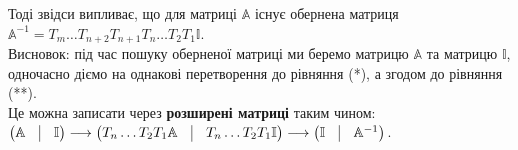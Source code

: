 \documentclass[a4paper, 10pt]{article}
\theoremstyle{theoremdd}
\begin{document}
Тоді звідси випливає, що для матриці $\mathbb{A}$ існує обернена матриця $\mathbb{A}^{-1} = T_m \dots T_{n+2} T_{n+1} T_n \dots T_2 T_1 \mathbb{I}$.
\bigskip \\
Висновок: під час пошуку оберненої матриці ми беремо матрицю $\mathbb{A}$ та матрицю $\mathbb{I}$, одночасно діємо на однакові перетворення до рівняння (*), а згодом до рівняння (**).\\
Це можна записати через \textbf{розширені матриці} таким чином:\\
$\begin{pmatrix}
\mathbb{A} & \vline & \mathbb{I}
\end{pmatrix} \longrightarrow \begin{pmatrix}
T_n \dots T_2 T_1 \mathbb{A} & \vline & T_n \dots T_2 T_1 \mathbb{I}
\end{pmatrix} \longrightarrow \begin{pmatrix}
\mathbb{I} & \vline & \mathbb{A}^{-1}
\end{pmatrix}$.
\end{document}

